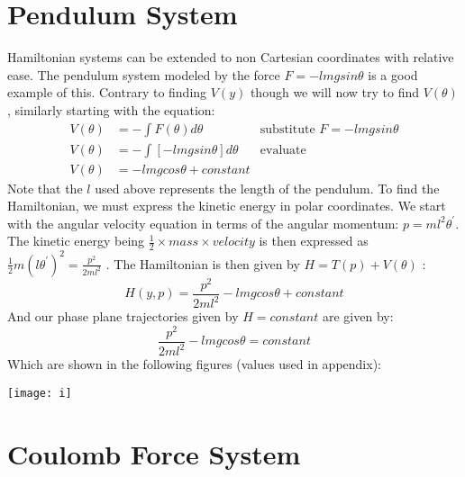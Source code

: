 \documentclass[12pt]{article}
\begin{document}
	\clearpage
	
	\section{Pendulum System}
	
	\indent \indent Hamiltonian systems can be extended to non Cartesian coordinates with relative ease. The pendulum system modeled by the force $F=-lmgsin\theta$ is a good example of this. Contrary to finding $V(y)$ though we will now try to find $V(\theta)$, similarly starting with the equation: 
	\begin{align*}
	V(\theta) &=-\int F(\theta) d\theta &\text{substitute $F=-lmgsin\theta$}
	\\
	V(\theta)&=-\int[-lmgsin\theta]d\theta &\text{evaluate}
	\\
	V(\theta)&=-lmgcos\theta + constant
	\end{align*}
	\indent  Note that the $l$ used above represents the length of the pendulum. To find the Hamiltonian, we must express the kinetic energy in polar coordinates. We start with the angular velocity equation in terms of the angular momentum: $p=ml^2\theta^\prime$. The kinetic energy being $\frac{1}{2}\times mass\times velocity$ is then expressed as $\frac{1}{2}m(l\theta^\prime)^2=\frac{p^2}{2ml^2}$ . The Hamiltonian is then given by $H=T(p)+V(\theta)$ :
	\begin{equation*}
	H(y,p)=\frac{p^2}{2ml^2}-lmgcos\theta + constant
	\end{equation*}
	\indent And our phase plane trajectories given by $H=constant$ are given by:
	\begin{equation*}
	\frac{p^2}{2ml^2}-lmgcos\theta = constant
	\end{equation*}
	\indent Which are shown in the following figures (values used in appendix):
	\begin{center}
		\texttt{[image: i]}
	\end{center}
	
	\clearpage
	
	\section{Coulomb Force System}
	
\end{document}
